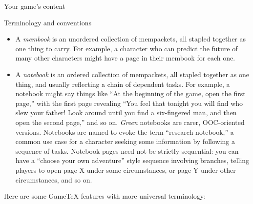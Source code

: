 \documentclass{article}
\newcommand{\gametex}{GameTeX}
\begin{document}
\begin{section}{Your game's content}
\begin{subsection}{Terminology and conventions}
\begin{itemize}
    \item A \textit{membook} is an unordered collection of mempackets, all stapled together as one thing to carry.  For example, a character who can predict the future of many other characters might have a page in their membook for each one.
    \item A \textit{notebook} is an ordered collection of mempackets, all stapled together as one thing, and usually reflecting a chain of dependent tasks.  For example, a notebook might say things like ``At the beginning of the game, open the first page,'' with the first page revealing ``You feel that tonight you will find who slew your father!  Look around until you find a six-fingered man, and then open the second page,'' and so on.  \textit{Green} notebooks are rarer, OOC-oriented versions.  Notebooks are named to evoke the term ``research notebook,'' a common use case for a character seeking some information by following a sequence of tasks.
    Notebook pages need not be strictly sequential: you can have a ``choose your own adventure'' style sequence involving branches, telling players to open page X under some circumstances, or page Y under other circumstances, and so on.
\end{itemize}

Here are some \gametex{} features with more universal terminology:


\end{subsection}
\end{section}
\end{document}
